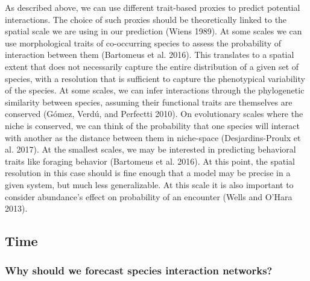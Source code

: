 \documentclass[10pt,oneside]{article}
\begin{document}
As described above, we can use different trait-based proxies to predict
potential interactions. The choice of such proxies should be
theoretically linked to the spatial scale we are using in our prediction
(Wiens 1989). At some scales we can use morphological traits of
co-occurring species to assess the probability of interaction between
them (Bartomeus et al. 2016). This translates to a spatial extent that
does not necessarily capture the entire distribution of a given set of
species, with a resolution that is sufficient to capture the
phenotypical variability of the species. At some scales, we can infer
interactions through the phylogenetic similarity between species,
assuming their functional traits are themselves are conserved (Gómez,
Verdú, and Perfectti 2010). On evolutionary scales where the niche is
conserved, we can think of the probability that one species will
interact with another as the distance between them in niche-space
(Desjardins-Proulx et al. 2017). At the smallest scales, we may be
interested in predicting behavioral traits like foraging behavior
(Bartomeus et al. 2016). At this point, the spatial resolution in this
case should is fine enough that a model may be precise in a given
system, but much less generalizable. At this scale it is also important
to consider abundance's effect on probability of an encounter (Wells and
O'Hara 2013).

\hypertarget{time}{%
\subsection{Time}\label{time}}

\hypertarget{why-should-we-forecast-species-interaction-networks}{%
\subsubsection{Why should we forecast species interaction
networks?}\label{why-should-we-forecast-species-interaction-networks}}
\end{document}

